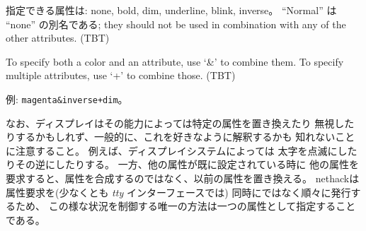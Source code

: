 指定できる属性は:
none, bold, dim, underline, blink, inverse。
``Normal'' は ``none'' の別名である;
they should not be used in combination with any of the other attributes.
(TBT)

To specify both a color and an attribute, use `\&' to combine them.
To specify multiple attributes, use `+' to combine those.
(TBT)

例: {\tt magenta\&inverse+dim}。

なお、ディスプレイはその能力によっては特定の属性を置き換えたり
無視したりするかもしれず、一般的に、これを好きなように解釈するかも
知れないことに注意すること。
例えば、ディスプレイシステムによっては
太字を点滅にしたりその逆にしたりする。
一方、他の属性が既に設定されている時に
他の属性を要求すると、属性を合成するのではなく、以前の属性を置き換える。
nethackは属性要求を(少なくとも {\it tty}  インターフェースでは)
同時にではなく順々に発行するため、
この様な状況を制御する唯一の方法は一つの属性として指定することである。


